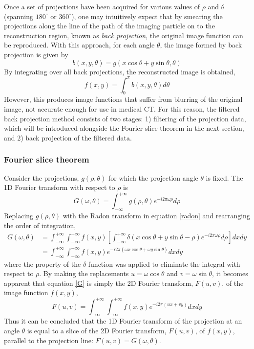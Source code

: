\documentclass[11pt,a4paper]{article}
\begin{document}
Once a set of projections have been acquired for various values of $\rho$ and $\theta$ (spanning $180^{\circ}$ or $360^{\circ}$), one may intuitively expect that by smearing the projections along the line of the path of the imaging particle on to the reconstruction region, known as \textit{back projection}, the original image function can be reproduced. With this approach, for each angle $\theta$, the image formed by back projection is given by 
\begin{equation}
b(x,y, \theta) = g(x \cos \theta + y \sin \theta, \theta) 
\end{equation}
By integrating over all back projections, the reconstructed image is obtained,
\begin{equation}
f(x,y) = \int_0^\pi b(x,y,\theta) d\theta
\end{equation}
However, this produces image functions that suffer from blurring of the original image, not accurate enough for use in medical CT. For this reason, the filtered back projection method consists of two stages: 1) filtering of the projection data, which will be introduced alongside the Fourier slice theorem in the next section, and 2) back projection of the filtered data.

\subsubsection{Fourier slice theorem}
Consider the projections, $g(\rho, \theta)$ for which the projection angle $\theta$ is fixed. The 1D Fourier transform with respect to $\rho$ is
\begin{equation}
G(\omega, \theta) = \int_{-\infty}^{+\infty}g(\rho, \theta) e^{-i 2\pi \omega \rho} d\rho
\end{equation}
Replacing $g(\rho, \theta)$ with the Radon transform in equation \ref{radon} and rearranging the order of integration,
\begin{align}
G(\omega, \theta) &= \int_{-\infty}^{+\infty}\int_{-\infty}^{+\infty}f(x,y) \left[\int_{-\infty}^{+\infty}\delta(x \cos \theta + y \sin \theta - \rho) e^{-i 2 \pi \omega \rho}d\rho\right]dx dy \\
& = \int_{-\infty}^{+\infty}\int_{-\infty}^{+\infty} f(x,y) e^{-i 2 \pi (\omega x \cos \theta + \omega y \sin \theta)} dx dy \label{G}
\end{align}
where the property of the $\delta$ function was applied to eliminate the integral with respect to $\rho$. By making the replacements $ u = \omega \cos \theta$ and $v = \omega \sin \theta$, it becomes apparent that equation \ref{G} is simply the  2D Fourier transform, $F(u,v)$, of the image function $f(x,y)$,
\begin{equation}
F(u,v) = \int_{-\infty}^{+\infty}\int_{-\infty}^{+\infty} f(x,y) e^{-i 2 \pi (ux + vy)} dx dy
\label{f2d}
\end{equation}
Thus it can be concluded that the 1D Fourier transform of the projection at an angle $\theta$ is equal to a slice of the 2D Fourier transform, $F(u,v)$, of $f(x,y)$, parallel to the projection line: $F(u,v) = G(\omega, \theta)$.
\end{document}
